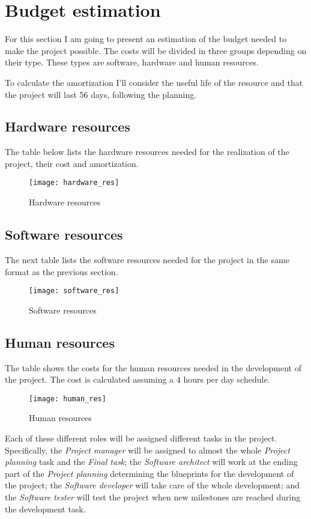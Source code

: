 \section{Budget estimation}

For this section I am going to present an estimation of the budget needed to make 
the project possible. The costs will be divided in three groups depending on their 
type. These types are software, hardware and human resources.

To calculate the amortization I'll consider the useful life of the resource and that 
the project will last 56 days, following the planning.

\subsection{Hardware resources}

The table below lists the hardware resources needed for the realization of the project, 
their cost and amortization.
\begin{figure}[H]
    \centering
    \texttt{[image: hardware\_res]}
    \caption{Hardware resources}
    \label{fig:hardware_res}
\end{figure}

\subsection{Software resources}

The next table lists the software resources needed for the project in the same format 
as the previous section.
\begin{figure}[H]
    \centering
    \texttt{[image: software\_res]}
    \caption{Software resources}
    \label{fig:software_res}
\end{figure}

\subsection{Human resources}

The table shows the costs for the human resources needed in the development of the 
project. The cost is calculated assuming a 4 hours per day schedule.
\begin{figure}[H]
    \centering
    \texttt{[image: human\_res]}
    \caption{Human resources}
    \label{fig:human_res}
\end{figure}

Each of these different roles will be assigned different tasks in the project. Specifically, 
the \textit{Project manager} will be assigned to almost the whole \textit{Project 
planning} task and the \textit{Final task}; the \textit{Software architect} will work 
at the ending part of the \textit{Project planning} determining the blueprints for 
the development of the project; the \textit{Software developer} will take care of 
the whole development; and the \textit{Software tester} will test the project when 
new milestones are reached during the development task.

